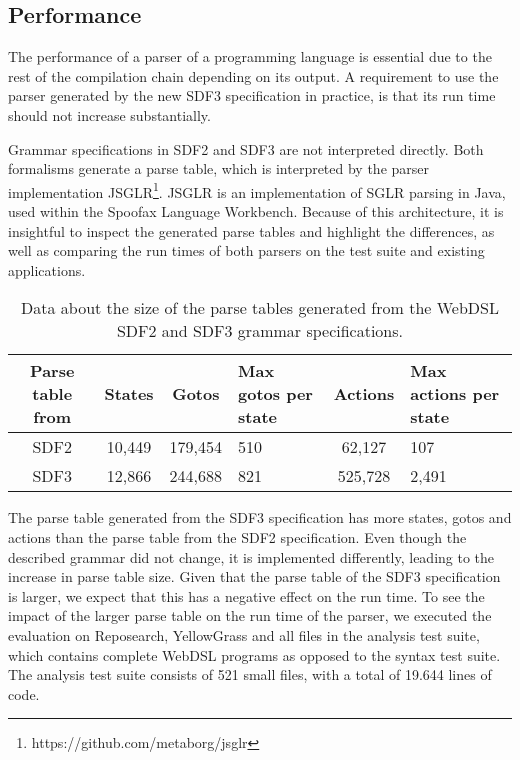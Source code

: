   \subsection{Performance}

    The performance of a parser of a programming language is essential due to the rest of the compilation chain depending on its output. A requirement to use the parser generated by the new SDF3 specification in practice, is that its run time should not increase substantially.

    Grammar specifications in SDF2 and SDF3 are not interpreted directly. Both formalisms generate a parse table, which is interpreted by the parser implementation JSGLR\footnote{https://github.com/metaborg/jsglr}. JSGLR is an implementation of SGLR parsing in Java, used within the Spoofax Language Workbench. Because of this architecture, it is insightful to inspect the generated parse tables and highlight the differences, as well as comparing the run times of both parsers on the test suite and existing applications.

    \begin{table}[h]
      \centering
      \begin{tabular}{ |c||c | c | p{2cm} | c | p{2.2cm}| }
        \hline
        Parse table from & States & Gotos & Max gotos per state & Actions & Max actions per state \\
        \hline\hline
        SDF2 & 10,449 & 179,454 & 510 & 62,127 & 107 \\
        \hline
        SDF3 & 12,866 & 244,688 & 821 & 525,728 & 2,491 \\
        \hline
      \end{tabular}
      \caption{\label{tbl:parse-table-differences}Data about the size of the parse tables generated from the WebDSL SDF2 and SDF3 grammar specifications.}
    \end{table}

    The parse table generated from the SDF3 specification has more states, gotos and actions than the parse table from the SDF2 specification. Even though the described grammar did not change, it is implemented differently, leading to the increase in parse table size. Given that the parse table of the SDF3 specification is larger, we expect that this has a negative effect on the run time. To see the impact of the larger parse table on the run time of the parser, we executed the evaluation on Reposearch, YellowGrass and all files in the analysis test suite, which contains complete WebDSL programs as opposed to the syntax test suite. The analysis test suite consists of 521 small files, with a total of 19.644 lines of code.

